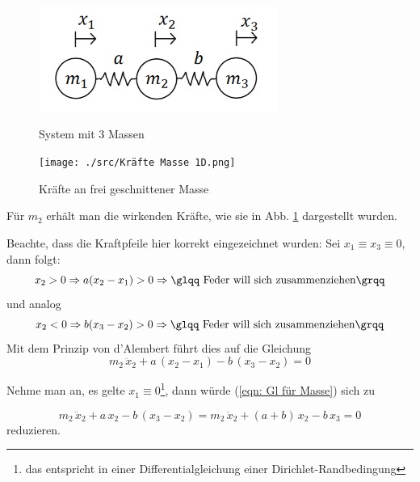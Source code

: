 \documentclass[a4paper,12pt]{report}
\newcommand{\zitat}[1]{\glqq #1\grqq}
\newcommand{\1}{\mathds{1}}
\theoremstyle{plain} %
\theoremstyle{definition} %
\theoremstyle{remark}
\begin{document}
            \begin{figure}[h!t]
                  \centering
                  \begin{minipage}[ht]{0.49\linewidth}
                        \centering
                        \includegraphics[width=0.7\textwidth, keepaspectratio]{./3 Massen System.png}
                        \caption{System mit 3 Massen}
                        \label{fig: 3 Massen System}
                  \end{minipage}
                  \hfill
                  \begin{minipage}[ht]{0.49\linewidth}
                        \centering
                        \texttt{[image: ./src/Kräfte Masse 1D.png]}
                        \caption{Kräfte an frei geschnittener Masse}
                        \label{fig: Kräfte Masse 1D}
                  \end{minipage}
            \end{figure}

            Für $m_2$ erhält man die wirkenden Kräfte, wie sie in Abb. \ref{fig: Kräfte Masse 1D} dargestellt wurden.

            Beachte, dass die Kraftpfeile hier korrekt eingezeichnet wurden:
            Sei $x_1 \equiv x_3 \equiv 0$, dann folgt:
            $$x_2 > 0 \Rightarrow a(x_2-x_1) > 0 \Rightarrow \text{\zitat{Feder will sich zusammenziehen}}$$
            und analog
            $$x_2 < 0 \Rightarrow b(x_3-x_2) > 0 \Rightarrow \text{\zitat{Feder will sich zusammenziehen}}$$
            Mit dem Prinzip von d'Alembert führt dies auf die Gleichung
            \begin{equation}
                  \label{eqn: Gl für Masse}
                  m_2\,\ddot x_2 + a\,(x_2-x_1) - b\,(x_3-x_2) = 0
            \end{equation}

            Nehme man an,  es gelte $x_1 \equiv 0$\footnote{das entspricht in einer Differentialgleichung einer Dirichlet-Randbedingung},
            dann würde (\ref{eqn: Gl für Masse}) sich zu

            \begin{equation}
                  \label{eqn: Gl für Masse mit Rand links}
                  m_2\,\ddot x_2 + a\,x_2 - b\,(x_3-x_2) = m_2\,\ddot x_2 + (a+b)\,x_2 -b\,x_3 = 0
            \end{equation}
            reduzieren.
\end{document}
